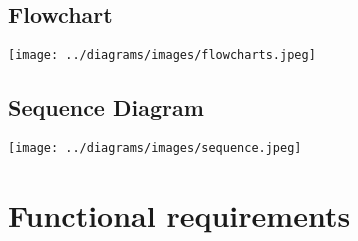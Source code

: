 \documentclass{article}
\begin{document}
\subsection{Flowchart}
\begin{center}
\texttt{[image: ../diagrams/images/flowcharts.jpeg]}
\end{center}

\subsection{Sequence Diagram}
\begin{center}
\texttt{[image: ../diagrams/images/sequence.jpeg]}
\end{center}




\section{Functional requirements}
\end{document}
